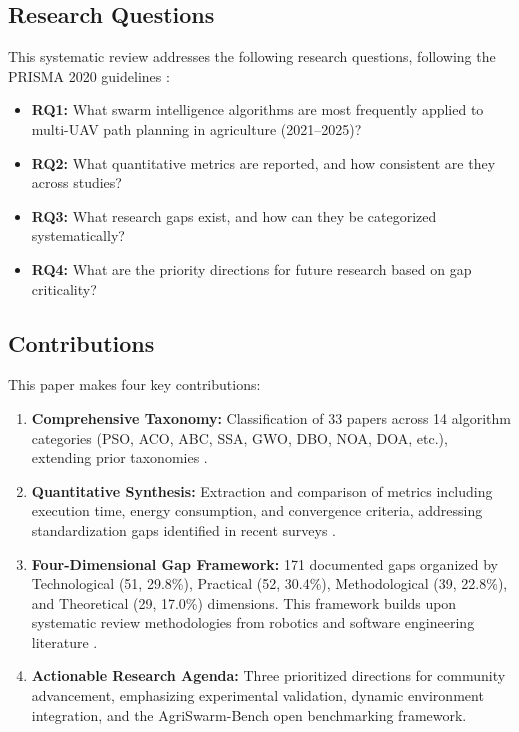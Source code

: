 \documentclass[review,3p,times]{elsarticle}
\begin{document}
\subsection{Research Questions}
This systematic review addresses the following research questions, following the PRISMA 2020 guidelines \cite{page2021}:
\begin{itemize}
  \item \textbf{RQ1:} What swarm intelligence algorithms are most frequently applied to multi-UAV path planning in agriculture (2021--2025)?
  \item \textbf{RQ2:} What quantitative metrics are reported, and how consistent are they across studies?
  \item \textbf{RQ3:} What research gaps exist, and how can they be categorized systematically?
  \item \textbf{RQ4:} What are the priority directions for future research based on gap criticality?
\end{itemize}

\subsection{Contributions}
This paper makes four key contributions:
\begin{enumerate}
    \item \textbf{Comprehensive Taxonomy:} Classification of 33 papers across 14 algorithm categories (PSO, ACO, ABC, SSA, GWO, DBO, NOA, DOA, etc.), extending prior taxonomies \cite{chung2018,brambilla2013,puente2022,sharma2022}.
    \item \textbf{Quantitative Synthesis:} Extraction and comparison of metrics including execution time, energy consumption, and convergence criteria, addressing standardization gaps identified in recent surveys \cite{phung2021,pan2022,aitsaadi2022}.
    \item \textbf{Four-Dimensional Gap Framework:} 171 documented gaps organized by Technological (51, 29.8\%), Practical (52, 30.4\%), Methodological (39, 22.8\%), and Theoretical (29, 17.0\%) dimensions. This framework builds upon systematic review methodologies from robotics and software engineering literature \cite{brambilla2013,bayindir2016}.
    \item \textbf{Actionable Research Agenda:} Three prioritized directions for community advancement, emphasizing experimental validation, dynamic environment integration, and the AgriSwarm-Bench open benchmarking framework.
\end{enumerate}
\end{document}
